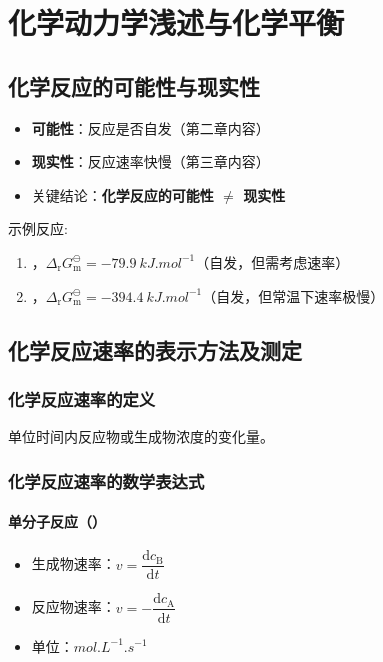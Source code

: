 \chapter{化学动力学浅述与化学平衡}

\section*{化学反应的可能性与现实性}
\begin{itemize}
\item \textbf{可能性}：反应是否自发（第二章内容）
\item \textbf{现实性}：反应速率快慢（第三章内容）
\item 关键结论：\textbf{化学反应的可能性 \(\neq\) 现实性}
\end{itemize}

示例反应:

\begin{enumerate}
\item {}，\(\Delta_\text{r} G_\text{m}^\ominus = \SI{-79.9}{kJ.mol^{-1}}\)（自发，但需考虑速率）
\item {}，\(\Delta_\text{r} G_\text{m}^\ominus = \qty{-394.4}{kJ.mol^{-1}}\)（自发，但常温下速率极慢）
\end{enumerate}

\section{化学反应速率的表示方法及测定}
\subsection{化学反应速率的定义}
单位时间内反应物或生成物浓度的变化量。

\subsection{化学反应速率的数学表达式}
\subsubsection{单分子反应（）}
\begin{itemize}
\item 生成物速率：$v = \dfrac{\mathrm{d}c_{\text{B}}}{\mathrm{d}t}$
\item 反应物速率：$v = -\dfrac{\mathrm{d}c_{\text{A}}}{\mathrm{d}t}$
\item 单位：$\si{mol.L^{-1}.s^{-1}}$
\end{itemize}


